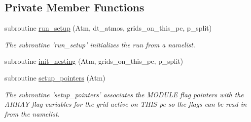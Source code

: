 \subsection*{Private Member Functions}
\begin{DoxyCompactItemize}
\item 
subroutine \hyperlink{classfv__control__mod_acdd82af4ac35306817aa955d95ec09f9}{run\-\_\-setup} (Atm, dt\-\_\-atmos, grids\-\_\-on\-\_\-this\-\_\-pe, p\-\_\-split)
\begin{DoxyCompactList}\small\item\em The subroutine 'run\-\_\-setup' initializes the run from a namelist. \end{DoxyCompactList}\item 
subroutine \hyperlink{classfv__control__mod_a1b8adec29d73938d0ce672126c20f323}{init\-\_\-nesting} (Atm, grids\-\_\-on\-\_\-this\-\_\-pe, p\-\_\-split)
\item 
subroutine \hyperlink{classfv__control__mod_ac0ed388b3e29b664d242cdc28fc0bd64}{setup\-\_\-pointers} (Atm)
\begin{DoxyCompactList}\small\item\em The subroutine 'setup\-\_\-pointers' associates the M\-O\-D\-U\-L\-E flag pointers with the A\-R\-R\-A\-Y flag variables for the grid active on T\-H\-I\-S pe so the flags can be read in from the namelist. \end{DoxyCompactList}\end{DoxyCompactItemize}
